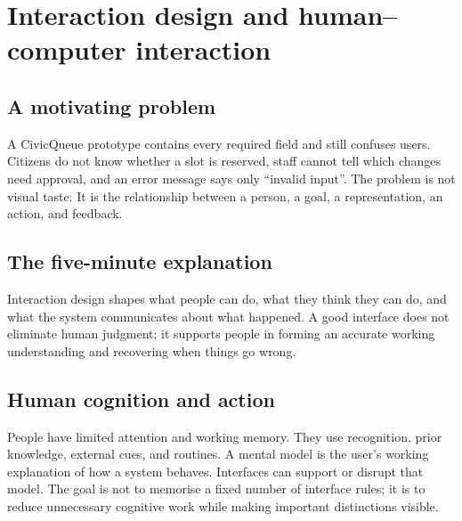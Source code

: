 \chapter{Interaction design and human--computer interaction}
\label{ch:hci}

\section{A motivating problem}
A CivicQueue prototype contains every required field and still confuses users. Citizens do not know whether a slot is reserved, staff cannot tell which changes need approval, and an error message says only \enquote{invalid input}. The problem is not visual taste. It is the relationship between a person, a goal, a representation, an action, and feedback.


\section{The five-minute explanation}
Interaction design shapes what people can do, what they think they can do, and what the system communicates about what happened. A good interface does not eliminate human judgment; it supports people in forming an accurate working understanding and recovering when things go wrong.


\section{Human cognition and action}
People have limited attention and working memory. They use recognition, prior knowledge, external cues, and routines. A mental model is the user's working explanation of how a system behaves. Interfaces can support or disrupt that model. The goal is not to memorise a fixed number of interface rules; it is to reduce unnecessary cognitive work while making important distinctions visible.

